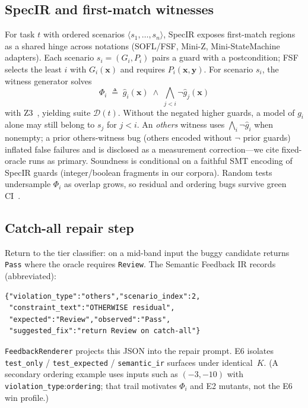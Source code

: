\documentclass[10pt,conference]{IEEEtran}
\begin{document}
\subsection{SpecIR and first-match witnesses}
For task $t$ with ordered scenarios $\langle s_1,\ldots,s_n\rangle$, SpecIR
exposes first-match regions as a shared hinge across notations (SOFL/FSF,
Mini-Z, Mini-StateMachine adapters).
Each scenario $s_i=(G_i,P_i)$ pairs a guard with a postcondition; FSF selects
the least $i$ with $G_i(\mathbf{x})$ and requires $P_i(\mathbf{x},\mathbf{y})$.
For scenario $s_i$, the witness generator solves
\begin{equation}
  \Phi_i \;\triangleq\; \hat{g}_i(\mathbf{x})
  \;\land\; \bigwedge_{j<i}\lnot\hat{g}_j(\mathbf{x})
\end{equation}
with Z3~\cite{demoura2008z3,barrett2018smt}, yielding suite $\mathcal{D}(t)$.
Without the negated higher guards, a model of $g_i$ alone may still belong to
$s_j$ for $j{<}i$.
An \emph{others} witness uses $\bigwedge_i\lnot\hat{g}_i$ when nonempty; a
prior others-witness bug (others encoded without $\neg$ prior guards)
inflated false failures and is disclosed as a measurement correction---we cite
fixed-oracle runs as primary.
Soundness is conditional on a faithful SMT encoding of SpecIR guards
(integer/boolean fragments in our corpora).
Random tests undersample $\Phi_i$ as overlap grows, so residual and ordering
bugs survive green CI~\cite{zhu1997specification,ammann2016testing}.

\subsection{Catch-all repair step}
Return to the tier classifier: on a mid-band input the buggy candidate returns
\texttt{Pass} where the oracle requires \texttt{Review}.
The Semantic Feedback IR records (abbreviated):
\begin{lstlisting}
{"violation_type":"others","scenario_index":2,
 "constraint_text":"OTHERWISE residual",
 "expected":"Review","observed":"Pass",
 "suggested_fix":"return Review on catch-all"}
\end{lstlisting}
\texttt{FeedbackRenderer} projects this JSON into the repair prompt.
E6 isolates \texttt{test\_only} / \texttt{test\_expected} / \texttt{semantic\_ir}
surfaces under identical~$K$.
(A secondary ordering example uses inputs such as $(-3,-10)$ with
\texttt{violation\_type}:\texttt{ordering}; that trail motivates $\Phi_i$ and
E2 mutants, not the E6 win profile.)
\end{document}
